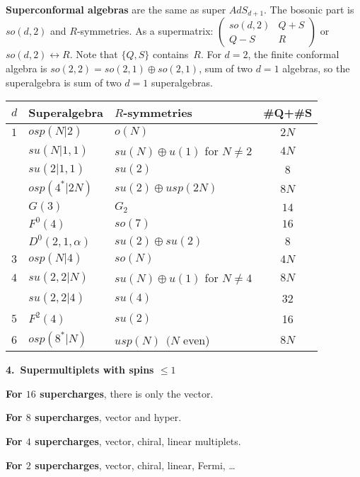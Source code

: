 \documentclass[10pt,letterpaper]{article}
\def\mysection #1#2{\medskip\pagebreak[1]\noindent\textbf{\large #1.\ #2}\smallskip}
\def\myparagraph #1{\textbf{#1}}
\begin{document}
\myparagraph{Superconformal algebras} are the same as super $AdS_{d+1}$.
The bosonic part is $so(d,2)$ and $R$-symmetries.
As a supermatrix: $\begin{pmatrix}so(d,2)& Q+S\\ Q-S&R\end{pmatrix}$ or $so(d,2)\leftrightarrow R$.  Note that $\{Q,S\}$ contains~$R$.
For $d=2$, the finite conformal algebra is $so(2,2)=so(2,1)\oplus so(2,1)$, sum of two $d=1$ algebras, so the superalgebra is sum of two $d=1$ superalgebras.
\begin{center}
\vspace{-.5\baselineskip}
\begin{tabular}{lllc}\toprule
$d$& Superalgebra& $R$-symmetries & \#Q+\#S\\ \midrule
$1$&  $osp(N|2)$ & $o(N)$    & $2N$ \\
   &  $su(N|1,1)$  &$su(N)\oplus u(1)$ for $N\neq 2$ &$ 4N$ \\
   &  $su(2|1,1)           $    &$su(2)              $ &$ 8   $\\
   &  $osp(4^*|2N)         $    &$su(2)\oplus usp(2N)$ &$ 8N  $\\
   &  $G(3)                $    &$G_2                $ &$ 14  $\\
   &  $F^0(4)                $    &$so(7)              $ &$ 16  $\\
   &  $D^0(2,1,\alpha)     $    &$su(2)\oplus su(2)  $ &$  8  $\\  \midrule
$3$&$ osp(N|4)   $ &$ so(N) $&$ 4N $\\   \midrule
$4$&$ su(2,2|N)  $ &$su(N)\oplus u(1)$ for $N\neq 4$&$ 8N$\\
   &$ su(2,2|4)  $ &$  su(4)$ & 32\\  \midrule
$5$&$ F^2(4)       $ &$ su(2) $ & 16 \\       \midrule
$6$&$ osp(8^*|N) $ &$  usp(N)\ \ (N $ even)& $8N$ \\
\bottomrule
\end{tabular}
\end{center}


\mysection{4}{Supermultiplets with spins $\leq 1$}

\myparagraph{For $16$ supercharges}, there is only the vector.

\myparagraph{For $8$ supercharges}, vector and hyper.

\myparagraph{For $4$ supercharges}, vector, chiral, linear multiplets.

\myparagraph{For $2$ supercharges}, vector, chiral, linear, Fermi, \ldots{}
\end{document}
